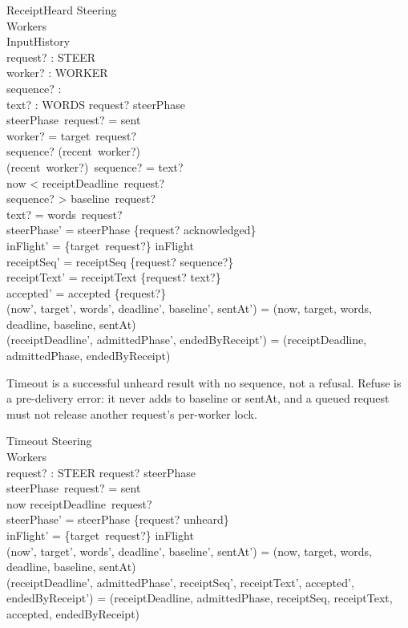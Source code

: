 \documentclass[a4paper,10pt,fleqn]{article}
\begin{document}
\begin{schema}{ReceiptHeard}
  \Delta Steering \\
  \Xi Workers \\
  \Xi InputHistory \\
  request? : STEER \\
  worker? : WORKER \\
  sequence? : \nat \\
  text? : WORDS
\where
  request? \in \dom steerPhase \\
  steerPhase~request? = sent \\
  worker? = target~request? \\
  sequence? \in \dom (recent~worker?) \\
  (recent~worker?)~sequence? = text? \\
  now < receiptDeadline~request? \\
  sequence? > baseline~request? \\
  text? = words~request? \\
  steerPhase' = steerPhase \oplus \{request? \mapsto acknowledged\} \\
  inFlight' = \{target~request?\} \ndres inFlight \\
  receiptSeq' = receiptSeq \cup \{request? \mapsto sequence?\} \\
  receiptText' = receiptText \cup \{request? \mapsto text?\} \\
  accepted' = accepted \cup \{request?\} \\
  (now', target', words', deadline', baseline', sentAt') =
    (now, target, words, deadline, baseline, sentAt) \\
  (receiptDeadline', admittedPhase', endedByReceipt') =
    (receiptDeadline, admittedPhase, endedByReceipt)
\end{schema}

Timeout is a successful unheard result with no sequence, not a refusal.
Refuse is a pre-delivery error: it never adds to baseline or sentAt, and a
queued request must not release another request's per-worker lock.

\begin{schema}{Timeout}
  \Delta Steering \\
  \Xi Workers \\
  request? : STEER
\where
  request? \in \dom steerPhase \\
  steerPhase~request? = sent \\
  now \geq receiptDeadline~request? \\
  steerPhase' = steerPhase \oplus \{request? \mapsto unheard\} \\
  inFlight' = \{target~request?\} \ndres inFlight \\
  (now', target', words', deadline', baseline', sentAt') =
    (now, target, words, deadline, baseline, sentAt) \\
  (receiptDeadline', admittedPhase', receiptSeq', receiptText', accepted', endedByReceipt') =
    (receiptDeadline, admittedPhase, receiptSeq, receiptText, accepted, endedByReceipt)
\end{schema}
\end{document}
